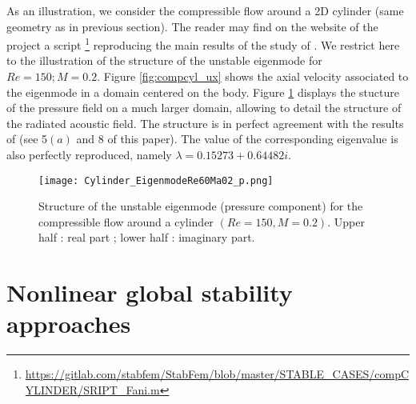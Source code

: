 \documentclass[twocolumn,10pt]{asme2ej}
\begin{document}
As an illustration, we consider the compressible flow around a 2D cylinder (same geometry as in previous section). The reader may find on the website of the project a script \footnote{ \url{https://gitlab.com/stabfem/StabFem/blob/master/STABLE_CASES/compCYLINDER/SRIPT_Fani.m}} reproducing the main results of the study of \cite{Fani2018}. We restrict here to the illustration of the structure of the unstable eigenmode for $Re = 150; M = 0.2$. Figure \ref{fig:compcyl_ux} shows the axial velocity associated to the eigenmode in a domain centered on the body. Figure \ref{fig:compcyl_p} displays the stucture of the pressure field on a much larger domain, allowing to detail the structure of the radiated acoustic field. The structure is in perfect agreement with the results of \cite{Fani2018} (see 5$(a)$ and $8$ of this paper). The value of the corresponding eigenvalue is also perfectly reproduced, namely $\lambda = 0.15273+0.64482i$.

 

 \begin{figure}
\texttt{[image: Cylinder\_EigenmodeRe60Ma02\_p.png]}
\caption{Structure of the unstable eigenmode (pressure component) for the compressible flow around a cylinder  $(Re= 150,M=0.2)$. Upper half : real part ; lower half : imaginary part. }
\label{fig:compcyl_p}
\end{figure}

\section{Nonlinear global stability approaches}
\vspace{.2cm}


\end{document}

